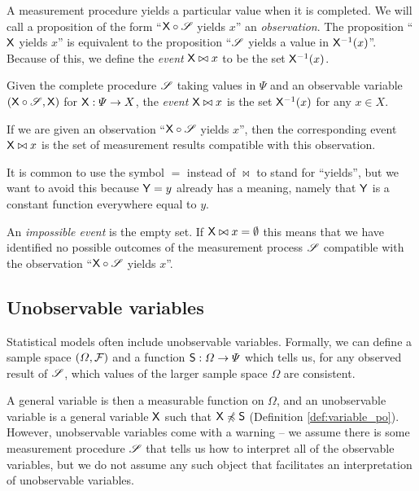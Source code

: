 A measurement procedure yields a particular value when it is completed. We will call a proposition of the form ``$\mathsf{X}\circ \mathscr{S}$ yields $x$'' an \emph{observation}. The proposition ``$\mathsf{X}$ yields $x$'' is equivalent to the proposition ``$\mathscr{S}$ yields a value in $\mathsf{X}^{-1}(x)$''. Because of this, we define the \emph{event} $\mathsf{X}\bowtie x$ to be the set $\mathsf{X}^{-1}(x)$.

\begin{definition}[Event]
Given the complete procedure $\mathscr{S}$ taking values in $\Psi$ and an observable variable $(\mathsf{X}\circ \mathscr{S},\mathsf{X})$ for $\mathsf{X}:\Psi\to X$, the \emph{event} $\mathsf{X}\bowtie x$ is the set $\mathsf{X}^{-1}(x)$ for any $x\in X$.
\end{definition}

If we are given an observation ``$\mathsf{X}\circ \mathscr{S}$ yields $x$'', then the corresponding event $\mathsf{X}\bowtie x$ is the set of measurement results compatible with this observation.

It is common to use the symbol $=$ instead of $\bowtie$ to stand for ``yields'', but we want to avoid this because $\mathsf{Y}=y$ already has a meaning, namely that $\mathsf{Y}$ is a constant function everywhere equal to $y$.

An \emph{impossible event} is the empty set. If $\mathsf{X}\bowtie x=\emptyset$ this means that we have identified no possible outcomes of the measurement process $\mathscr{S}$ compatible with the observation ``$\mathsf{X}\circ \mathscr{S}$ yields $x$''. 

\subsection{Unobservable variables}

Statistical models often include unobservable variables. Formally, we can define a sample space $(\Omega,\mathcal{F})$ and a function $\mathsf{S}:\Omega\to \Psi$ which tells us, for any observed result of $\mathscr{S}$, which values of the larger sample space $\Omega$ are consistent.

A general variable is then a measurable function on $\Omega$, and an unobservable variable is a general variable $\mathsf{X}$ such that $\mathsf{X}\not\preccurlyeq \mathsf{S}$ (Definition \ref{def:variable_po}). However, unobservable variables come with a warning -- we assume there is some measurement procedure $\mathscr{S}$ that tells us how to interpret all of the observable variables, but we do not assume any such object that facilitates an interpretation of unobservable variables.

